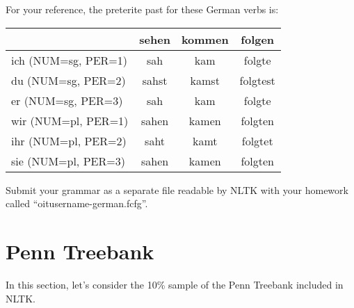 \documentclass[11pt,twoside]{article}
\begin{document}
For your reference, the preterite past for these German verbs is:

\begin{center}
\begin{tabular}{lccc}
 & sehen & kommen & folgen \\
 \hline
 ich (NUM=sg, PER=1) & sah & kam & folgte \\
 du (NUM=sg, PER=2) & sahst & kamst & folgtest \\
 er (NUM=sg, PER=3) & sah & kam & folgte \\
 wir (NUM=pl, PER=1) & sahen & kamen & folgten\\
 ihr (NUM=pl, PER=2) & saht & kamt & folgtet \\
 sie (NUM=pl, PER=3) & sahen & kamen & folgten \\
 \end{tabular}
 \end{center}
 
Submit your grammar as a separate file readable by NLTK with your homework called ``oitusername-german.fcfg''.  

\section{Penn Treebank}

In this section, let's consider the 10\% sample of the Penn Treebank included in NLTK.  
\end{document}
